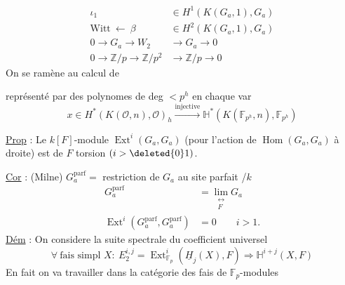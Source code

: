 \[
\begin{aligned}
\iota_1&\in H^1(K(G_a,1),G_a)\\
\text{Witt}\ \longleftarrow\ \beta&\in H^2(K(G_a,1),G_a)\\
0\to G_a\to W_2&\to G_a\to0\\
0\to\mathbb Z/p\to\mathbb Z/p^2&\to\mathbb Z/p\to0
\end{aligned}
\]
On se ramène au calcul de

représenté par des polynomes de deg $<p^h$ en chaque var
\[
x\in H^*(K(\mathcal O,n),\mathcal O)_h\xrightarrow{\text{injective}}\mathbb H^*(K(\mathbb F_{p^h},n),\mathbb F_{p^h})
\]


\uline{Prop} : Le $k[F]$-module $\operatorname{Ext}^i(G_a,G_a)$ (pour l'action de $\operatorname{Hom}(G_a,G_a)$ à droite) est de $F$ torsion $(i>\deleted{0}1)$.

\uline{Cor} : (Milne) $G_a^\mathrm{parf}=$ restriction de $G_a$ au site parfait /$k$
\[
\begin{aligned}
G_a^\mathrm{parf}&=\lim_{\substack{\longleftrightarrow\\ F}}G_a\\
\operatorname{Ext}^i(G_a^\mathrm{parf},G_a^\mathrm{parf})&=0\qquad i>1.
\end{aligned}
\]
\uline{Dém} : On considere la suite spectrale du coefficient universel
\[
\forall\ \text{fais simpl }X:\ E_2^{i,j}=\operatorname{Ext}^i_{\mathbb F_p}(\underline H_j(X),F)\Longrightarrow \mathbb H^{i+j}(X,F)
\]
En fait on va travailler dans la catégorie des fais de $\mathbb F_p$-modules

